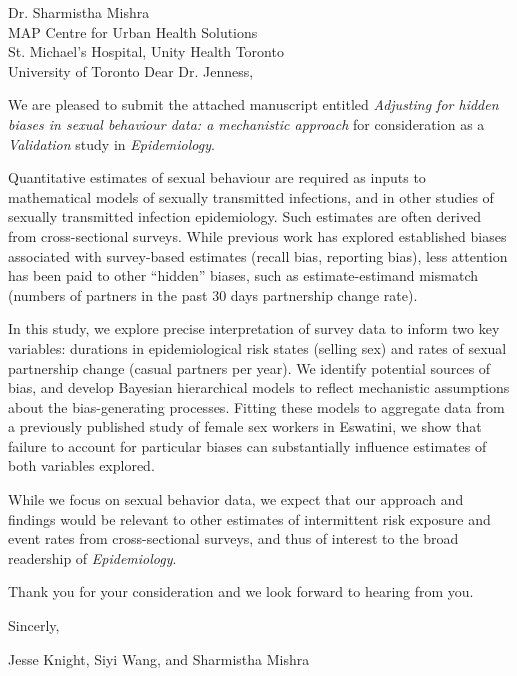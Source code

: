 \address{
  Dr. Samuel Jenness\\
  Editor\\
  Epidemiology
}{Dr. Sharmistha Mishra\\
  MAP Centre for Urban Health Solutions\\
  St. Michael's Hospital, Unity Health Toronto\\
  University of Toronto}
Dear Dr. Jenness,
\par
We are pleased to submit the attached manuscript entitled
\emph{Adjusting for hidden biases in sexual behaviour data: a mechanistic approach}
for consideration as a \emph{Validation} study in \emph{Epidemiology}.
\par
Quantitative estimates of sexual behaviour are required
as inputs to mathematical models of sexually transmitted infections,
and in other studies of sexually transmitted infection epidemiology.
Such estimates are often derived from cross-sectional surveys.
While previous work has explored established biases associated with survey-based estimates
(\eg recall bias, reporting bias),
less attention has been paid to other ``hidden'' biases, such as estimate-estimand mismatch
(\eg numbers of partners in the past 30 days \vs partnership change rate).
\par
In this study, we explore precise interpretation of survey data to inform two key variables:
durations in epidemiological risk states (\eg selling sex) and
rates of sexual partnership change (\eg casual partners per year).
We identify potential sources of bias,
and develop Bayesian hierarchical models to reflect
mechanistic assumptions about the bias-generating processes.
Fitting these models to aggregate data from
a previously published study of female sex workers in Eswatini,
we show that failure to account for particular biases can
substantially influence estimates of both variables explored.
\par
While we focus on sexual behavior data,
we expect that our approach and findings would be relevant to
other estimates of intermittent risk exposure and event rates from cross-sectional surveys,
and thus of interest to the broad readership of \emph{Epidemiology}.
\par
Thank you for your consideration and we look forward to hearing from you.
\medskip\par
Sincerly,
\par
Jesse Knight, Siyi Wang, and Sharmistha Mishra